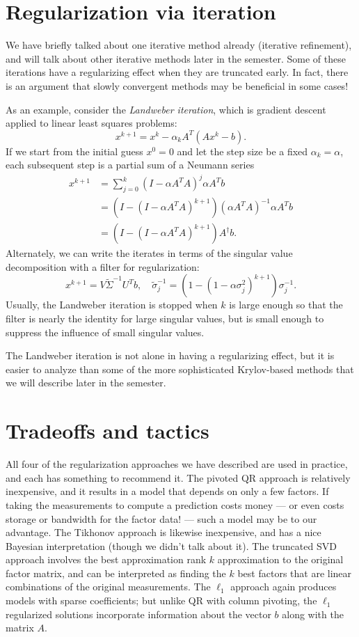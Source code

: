 \documentclass[12pt, leqno]{article} %
\begin{document}
\section{Regularization via iteration}

We have briefly talked about one iterative method already (iterative
refinement), and will talk about other iterative methods later in the
semester.  Some of these iterations have a regularizing effect when
they are truncated early.  In fact, there is an argument that slowly
convergent methods may be beneficial in some cases!

As an example, consider the {\em Landweber iteration}, which is
gradient descent applied to linear least squares problems:
\[
  x^{k+1} = x^k - \alpha_k A^T (Ax^k-b).
\]
If we start from the initial guess $x^0 = 0$ and let the step size be
a fixed $\alpha_k = \alpha$, each subsequent step is a partial sum of
a Neumann series
\begin{align*}
  x^{k+1}
  &= \sum_{j=0}^k (I-\alpha A^T A)^j \alpha A^T b \\
  &= \left(I - (I-\alpha A^TA)^{k+1} \right) (\alpha A^TA)^{-1} \alpha A^T b \\
  &= \left(I - (I-\alpha A^TA)^{k+1} \right) A^\dagger b.
\end{align*}
Alternately, we can write the iterates in terms of the singular value
decomposition with a filter for regularization:
\[
  x^{k+1} = V \tilde{\Sigma}^{-1} U^T b, \quad
  \tilde{\sigma}_j^{-1} = (1-(1-\alpha \sigma_j^2)^{k+1}) \sigma_j^{-1}.
\]
Usually, the Landweber iteration is stopped when $k$ is large enough
so that the filter is nearly the identity for large singular values,
but is small enough to suppress the influence of small singular
values.

The Landweber iteration is not alone in having a regularizing effect,
but it is easier to analyze than some of the more sophisticated
Krylov-based methods that we will describe later in the semester.

\section{Tradeoffs and tactics}

All four of the regularization approaches we have described are used
in practice, and each has something to recommend it.  The pivoted QR
approach is relatively inexpensive, and it results in a model that
depends on only a few factors.  If taking the measurements to compute
a prediction costs money --- or even costs storage or bandwidth for
the factor data! --- such a model may be to our advantage.  The
Tikhonov approach is likewise inexpensive, and has a nice Bayesian
interpretation (though we didn't talk about it).  The truncated SVD
approach involves the best approximation rank $k$ approximation to the
original factor matrix, and can be interpreted as finding the $k$ best
factors that are linear combinations of the original measurements.
The $\ell_1$ approach again produces models with sparse coefficients;
but unlike QR with column pivoting, the $\ell_1$ regularized solutions
incorporate information about the vector $b$ along with the matrix $A$.
\end{document}

